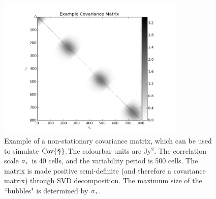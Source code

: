 \begin{figure}[h!]
\centering
\includegraphics[width=0.8\textwidth]{images/CovarianceMatrix.png}
\caption{\label{fig.covmat} Example of {a non-stationary covariance matrix}, which can be used to simulate $\textrm{Cov}\{\bm{\tilde{\gamma}}\}$.{The colourbar units are Jy$^2$}. The correlation scale $\sigma_\tau$ is 40 cells, and the variability period is 500 cells. The matrix is made positive semi-definite (and therefore a covariance matrix) through SVD decomposition. The maximum size of the ``bubbles" is determined by $\sigma_\tau$.}
\end{figure}


